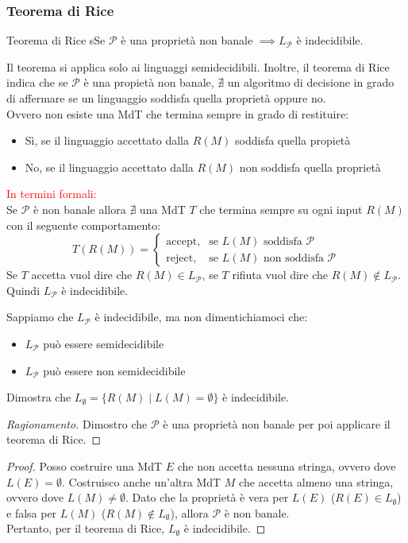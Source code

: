 \documentclass{article}  %
\theoremstyle{definition}
\newenvironment{ragionamento}[1][]
  {\begin{proof}[Ragionamento#1]\renewcommand{\qedsymbol}{}\normalfont}
  {\end{proof}}
\begin{document}
\subsubsection{Teorema di Rice}
\begin{theorem}{Teorema di Rice}
	sSe $\mathscr{P}$ è una proprietà non banale $\implies L_{\mathscr{P}}$ è indecidibile.
\end{theorem}
Il teorema si applica solo ai linguaggi semidecidibili. Inoltre, il teorema di Rice indica che se $\mathscr{P}$ è una propietà non banale,
$\nexists$ un algoritmo di decisione in grado di affermare se un linguaggio soddisfa quella proprietà oppure no. \\
Ovvero non esiste una MdT che termina sempre in grado di restituire:
\begin{itemize}
	\item Sì, se il linguaggio accettato dalla $R(M)$ soddisfa quella propietà
	\item No, se il linguaggio accettato dalla $R(M)$ non soddisfa quella proprietà
\end{itemize}
\textcolor{red}{In termini formali:} \\
Se $\mathscr{P}$ è non banale allora $\nexists$ una MdT $T$ che termina sempre su ogni input $R(M)$ con il seguente comportamento:
\[
	T(R(M))=
	\begin{cases}
		\text{accept,} & \text{se } L(M) \text{ soddisfa } \mathscr{P}     \\
		\text{reject,} & \text{se } L(M) \text{ non soddisfa } \mathscr{P}
	\end{cases}
\]
Se $T$ accetta vuol dire che $R(M) \in L_{\mathscr{P}}$, se $T$ rifiuta vuol dire che $R(M) \notin L_{\mathscr{P}}$. Quindi
$L_{\mathscr{P}}$ è indecidibile.
\begin{osservazioni}[Osservazioni]
	\footnotesize
	Sappiamo che $L_{\mathscr{P}}$ è indecidibile, ma non dimentichiamoci che:
	\begin{itemize}
		\item $L_{\mathscr{P}}$ può essere semidecidibile
		\item $L_{\mathscr{P}}$ può essere non semidecidibile
	\end{itemize}
\end{osservazioni}
\begin{esercizio}
	Dimostra che $L_{\emptyset}=\{R(M) \mid L(M)=\emptyset\}$ è indecidibile.
	\footnotesize %
	\begin{ragionamento}
		Dimostro che $\mathscr{P}$ è una proprietà non banale per poi applicare il teorema di Rice.
	\end{ragionamento}
	\begin{proof}
		Posso costruire una MdT $E$ che non accetta nessuna stringa, ovvero dove $L(E)=\emptyset$. Costruisco anche un'altra MdT $M$ che accetta almeno
		una stringa, ovvero dove $L(M)\neq\emptyset$. Dato che la proprietà è vera per $L(E)$ ($R(E) \in L_{\emptyset}$) e
		falsa per $L(M)$ ($R(M) \notin L_{\emptyset}$), allora
		$\mathscr{P}$ è non banale. \\
		Pertanto, per il teorema di Rice, $L_{\emptyset}$ è indecidibile.
	\end{proof}
\end{esercizio}
\end{document}
